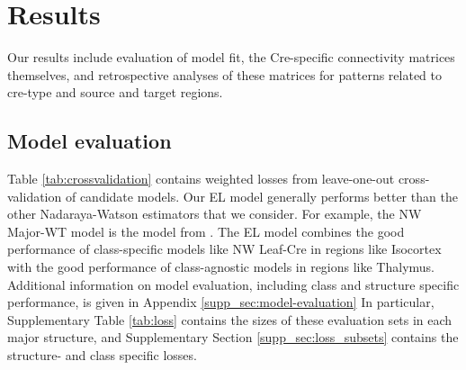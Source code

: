 \section{Results}
\label{sec:results}

Our results include evaluation of model fit, the Cre-specific connectivity matrices themselves, and retrospective analyses of these matrices for  patterns related to cre-type and source and target regions.

\subsection{Model evaluation}
\label{sec:model_eval}




Table \ref{tab:crossvalidation} contains weighted losses from leave-one-out cross-validation of candidate models.
Our EL model generally performs better than the other Nadaraya-Watson estimators that we consider.
For example, the NW Major-WT model is the model from  \citet{Knox2019-ot}.
The EL model combines the good performance of class-specific models like NW Leaf-Cre in regions like Isocortex with the good performance of class-agnostic models in regions like Thalymus.
Additional information on model evaluation, including class and structure specific performance, is given in Appendix \ref{supp_sec:model-evaluation}
In particular, Supplementary Table \ref{tab:loss} contains the sizes of these evaluation sets in each major structure, and Supplementary Section \ref{supp_sec:loss_subsets} contains the structure- and class specific losses.


